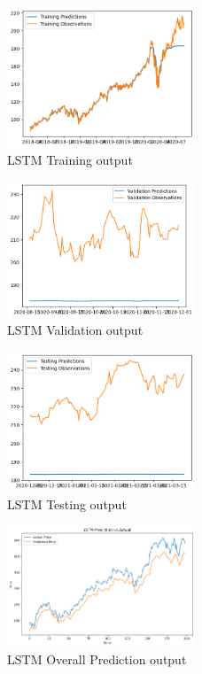 \documentclass[12pt,a4paper]{article}
\begin{document}
\begin{figure}[!h]
    \centering
    \includegraphics[width=0.5\textwidth]{Week3_LSTM_training.png} %
    \caption{LSTM Training output}
    \label{fig10}
\end{figure}

\begin{figure}[!h]
    \centering
    \includegraphics[width=0.5\textwidth]{Week3_LSTM_validation.png} %
    \caption{LSTM Validation output}
    \label{fig11}
\end{figure}

\begin{figure}[!h]
    \centering
    \includegraphics[width=0.5\textwidth]{Week3_LSTM_test.png} %
    \caption{LSTM Testing output}
    \label{fig12}
\end{figure}

\begin{figure}[!h]
    \centering
    \includegraphics[width=0.5\textwidth]{Week3_LSTM_prediction.png} %
    \caption{LSTM Overall Prediction output}
    \label{fig13}
\end{figure}
\end{document}
